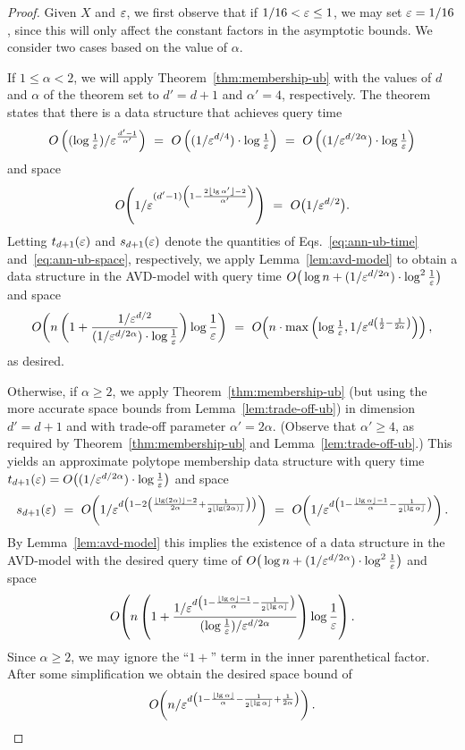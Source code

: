 \documentclass[11pt]{article}   \usepackage[letterpaper,hmargin=2.1cm,vmargin=3cm]{geometry}
\newcommand{\floor}[1]{\left\lfloor #1\right\rfloor}
\newcommand{\OO}[1]{O\kern-2pt\left(#1\right)}  \newcommand{\half}[1]{\frac{#1}{2}}
\newcommand{\inv}[1]{\frac{1}{#1}}
\begin{document}
\begin{proof}
Given $X$ and $\varepsilon$, we first observe that if $1/16 < \varepsilon \le 1$, we may set $\varepsilon = 1/16$, since this will only affect the constant factors in the asymptotic bounds. We consider two cases based on the value of $\alpha$. 

If $1 \le \alpha < 2$, we will apply Theorem~\ref{thm:membership-ub} with the values of $d$ and $\alpha$ of the theorem set to $d' = d+1$ and $\alpha' = 4$, respectively. The theorem states that there is a data structure that achieves query time 
\begin{equation}
	O\left(({\textstyle \log \inv{\eps}})/\eps^{\frac{d'-1}{\alpha'}}\right)
		~ = ~ O\left((1/\eps^{d/4}) \cdot \log {\textstyle \inv{\eps}}\right)
		~ = ~ O\left((1/\eps^{d/2 \alpha}) \cdot \log {\textstyle \inv{\eps}}\right) \label{eq:ann-ub-time}
\end{equation}
and space
\begin{equation}
	\OO{1/\eps^{(d'-1)\left(1 - \frac{2\floor{\lg \alpha'} - 2}{\alpha'} \right)}}
		~ = ~ O\big( 1/\eps^{d/2} \big). \label{eq:ann-ub-space}
\end{equation}
Letting $t_{d+1}(\varepsilon)$ and $s_{d+1}(\varepsilon)$ denote the quantities of Eqs.~\eqref{eq:ann-ub-time} and~\eqref{eq:ann-ub-space}, respectively, we apply Lemma~\ref{lem:avd-model} to obtain a data structure in the AVD-model with query time $O\big(\log n + (1/\eps^{d/2 \alpha}) \cdot \log^2 \inv{\eps}\big)$ and space
\[
	\OO{n \left( 1 + \frac{1/\eps^{d/2}}{(1/\eps^{d/2 \alpha}) \cdot \log \inv{\eps}} \right) \log \inv{\eps}}
	~ = ~
	\OO{n \cdot \max\left(\log {\textstyle \inv{\eps}}, 1/\eps^{d\left(\inv{2} -\inv{2\alpha}\right)}\right)},
\]
as desired.

Otherwise, if $\alpha \ge 2$, we apply Theorem~\ref{thm:membership-ub} (but using the more accurate space bounds from Lemma~\ref{lem:trade-off-ub}) in dimension $d' = d+1$ and with trade-off parameter $\alpha' = 2 \alpha$. (Observe that $\alpha' \ge 4$, as required by Theorem~\ref{thm:membership-ub} and Lemma~\ref{lem:trade-off-ub}.) This yields an approximate polytope membership data structure with query time $t_{d+1}(\eps) = O\big((1/\eps^{d/2 \alpha}) \cdot \log \inv{\eps} \big)$ and space
\[
  s_{d+1}(\eps) 
	~ = ~ \OO{1/\eps^{d \left(1 - 2 \left(\frac{\floor{\lg (2\alpha)} - 2}{2\alpha} + \inv{2^{\floor{\lg(2\alpha)}}} \right) \right)}}
	~ = ~ \OO{1/\eps^{d \left(1 - \frac{\floor{\lg \alpha} - 1}{\alpha} - \inv{2^{\floor{\lg \alpha}}} \right)}}.
\]
By Lemma~\ref{lem:avd-model} this implies the existence of a data structure in the AVD-model with the desired query time of $O\big(\log n + (1/\eps^{d/2 \alpha}) \cdot \log^2 \inv{\eps}\big)$ and space
\[
	\OO{n \left( 1 + \frac{1/\eps^{d \left(1 - \frac{\floor{\lg \alpha} - 1}{\alpha} - \inv{2^{\floor{\lg \alpha}}} \right)}}{({\textstyle \log \inv{\eps}})/\eps^{d/2 \alpha}} \right) \log\inv{\eps}}.
\]
Since $\alpha \ge 2$, we may ignore the ``$1+$'' term in the inner parenthetical factor. After some simplification we obtain the desired space bound of
\[
	\OO{n/\eps^{d \left(1 - \frac{\floor{\lg \alpha}}{\alpha} - \inv{2^{\floor{\lg \alpha}}} + \inv{2 \alpha} \right)}}.
\]


\end{proof}
\end{document}
